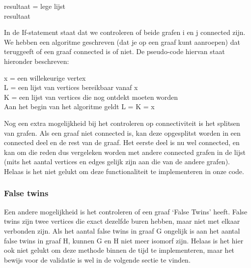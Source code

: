 \documentclass{article}
\begin{document}
\begin{algorithm}[H]
	resultaat = lege lijst\\
	\Return resultaat
\end{algorithm}
\vspace{5mm}

In de If-statement staat dat we controleren of beide grafen i en j connected zijn. We hebben een algoritme geschreven (dat je op een graaf kunt aanroepen) dat teruggeeft of een graaf connected is of niet. De pseudo-code hiervan staat hieronder beschreven:\\

\begin{algorithm}[H]
	x = een willekeurige vertex\\
	L = een lijst van vertices bereikbaar vanaf x\\
	K = een lijst van vertices die nog ontdekt moeten worden\\
	Aan het begin van het algoritme geldt L = K = x\\


\end{algorithm}
\vspace{5mm}

Nog een extra mogelijkheid bij het controleren op connectiviteit is het splitsen van grafen. Als een graaf niet connected is, kan deze opgesplitst worden in een connected deel en de rest van de graaf. Het eerste deel is nu wel connected, en kan om die reden dus vergeleken worden met andere connected grafen in de lijst (mits het aantal vertices en edges gelijk zijn aan die van de andere grafen). Helaas is het niet gelukt om deze functionaliteit te implementeren in onze code.

\subsubsection{False twins}
Een andere mogelijkheid is het controleren of een graaf `False Twins' heeft. False twins zijn twee vertices die exact dezelfde buren hebben, maar niet met elkaar verbonden zijn. Als het aantal false twins in graaf G ongelijk is aan het aantal false twins in graaf H, kunnen G en H niet meer isomorf zijn. Helaas is het hier ook niet gelukt om deze methode binnen de tijd te implementeren, maar het bewijs voor de validatie is wel in de volgende sectie te vinden.
\end{document}

